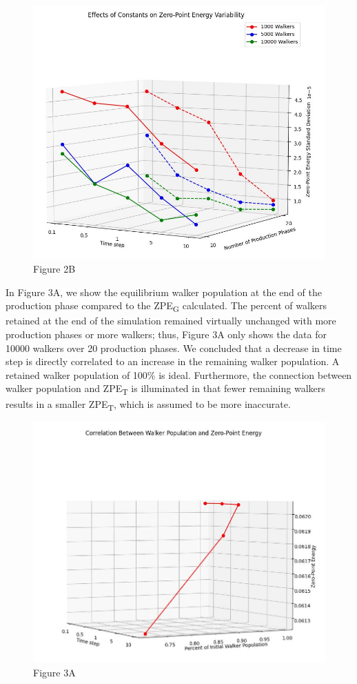 \documentclass[journal=jacsat,manuscript=article]{achemso}
\begin{document}
\begin{figure}
  \includegraphics[width=\linewidth]{fig_2B.jpg}
  \caption{Figure 2B}
  \label{fig:}
\end{figure}

In Figure 3A, we show the equilibrium walker population at the end of the production phase compared to the ZPE\textsubscript{G} calculated. The percent of walkers retained at the end of the simulation remained virtually unchanged with more production phases or more walkers; thus, Figure 3A only shows the data for 10000 walkers over 20 production phases. We concluded that a decrease in time step is directly correlated to an increase in the remaining walker population. A retained walker population of 100\% is ideal. Furthermore, the connection between walker population and ZPE\textsubscript{T} is illuminated in that fewer remaining walkers results in a smaller ZPE\textsubscript{T}, which is assumed to be more inaccurate. 

\begin{figure}
  \includegraphics[width=\linewidth]{fig_3A.jpg}
  \caption{Figure 3A}
  \label{fig:}
\end{figure}
\end{document}
